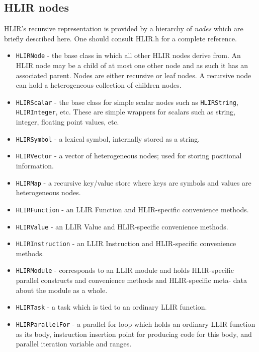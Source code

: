 \documentclass[12pt]{article}
\begin{document}
\subsection{HLIR nodes}

HLIR's recursive representation is provided by a hierarchy of {\it nodes} which are briefly described here. One should consult HLIR.h for a complete reference.

\begin{itemize}

\item {\tt HLIRNode} - the base class in which all other HLIR nodes derive from. An HLIR node may be a child of at most one other node and as such it has an associated parent. Nodes are either recursive or leaf nodes. A recursive node can hold a heterogeneous collection of children nodes.

\item {\tt HLIRScalar} - the base class for simple scalar nodes such as {\tt HLIRString}, {\tt HLIRInteger}, etc. These are simple wrappers for scalars such as string, integer, floating point values, etc.

\item {\tt HLIRSymbol} - a lexical symbol, internally stored as a string.

\item {\tt HLIRVector} - a vector of heterogeneous nodes; used for storing positional information.

\item {\tt HLIRMap} - a recursive key/value store where keys are symbols and values are heterogeneous nodes.

\item {\tt HLIRFunction} - an LLIR Function and HLIR-specific convenience methods.

\item {\tt HLIRValue} - an LLIR Value and HLIR-specific convenience methods.

\item {\tt HLIRInstruction} - an LLIR Instruction and HLIR-specific convenience
methods.

\item {\tt HLIRModule} - corresponds to an LLIR module and holds HLIR-specific parallel constructs and convenience methods and HLIR-specific meta- data about the module as a whole.

\item {\tt HLIRTask} - a task which is tied to an ordinary LLIR function.

\item {\tt HLIRParallelFor} - a parallel for loop which holds an ordinary LLIR function as its body, instruction insertion point for producing code for this body, and parallel iteration variable and ranges.

\end{itemize}
\end{document}
